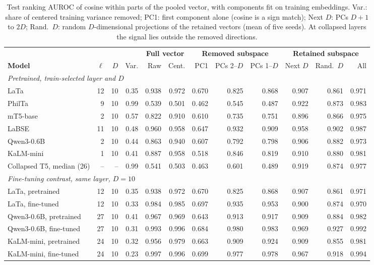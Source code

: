 \begin{table}[t]
\centering
\footnotesize
\setlength{\tabcolsep}{4pt}
\begin{tabular}{lrrrrrrrrrrr}
\toprule
& & & & \multicolumn{2}{c}{\textbf{Full vector}} & \multicolumn{3}{c}{\textbf{Removed subspace}} & \multicolumn{3}{c}{\textbf{Retained subspace}} \\
\cmidrule(lr){5-6}\cmidrule(lr){7-9}\cmidrule(lr){10-12}
\textbf{Model} & $\ell$ & $D$ & Var. & Raw & Cent. & PC1 & PCs 2--$D$ & PCs 1--$D$ & Next $D$ & Rand.\ $D$ & All \\
\midrule
\multicolumn{12}{l}{\emph{Pretrained, train-selected layer and $D$}} \\
LaTa & 12 & 10 & 0.35 & 0.938 & 0.972 & 0.670 & 0.825 & 0.868 & 0.907 & 0.861 & 0.971 \\
PhilTa & 9 & 10 & 0.99 & 0.539 & 0.501 & 0.462 & 0.545 & 0.487 & 0.922 & 0.873 & 0.983 \\
mT5-base & 2 & 10 & 0.57 & 0.822 & 0.910 & 0.610 & 0.735 & 0.751 & 0.896 & 0.866 & 0.975 \\
LaBSE & 11 & 10 & 0.48 & 0.960 & 0.958 & 0.647 & 0.932 & 0.909 & 0.958 & 0.902 & 0.987 \\
Qwen3-0.6B & 2 & 10 & 0.44 & 0.863 & 0.940 & 0.607 & 0.792 & 0.798 & 0.906 & 0.882 & 0.973 \\
KaLM-mini & 1 & 10 & 0.41 & 0.887 & 0.958 & 0.518 & 0.846 & 0.819 & 0.910 & 0.880 & 0.981 \\
Collapsed T5, median (26) & -- & -- & 0.99 & 0.541 & 0.503 & 0.463 & 0.601 & 0.489 & 0.919 & 0.874 & 0.977 \\
\midrule
\multicolumn{12}{l}{\emph{Fine-tuning contrast, same layer, $D=10$}} \\
LaTa, pretrained & 12 & 10 & 0.35 & 0.938 & 0.972 & 0.670 & 0.825 & 0.868 & 0.907 & 0.861 & 0.971 \\
LaTa, fine-tuned & 12 & 10 & 0.33 & 0.984 & 0.985 & 0.697 & 0.935 & 0.953 & 0.900 & 0.874 & 0.970 \\
Qwen3-0.6B, pretrained & 27 & 10 & 0.41 & 0.967 & 0.969 & 0.643 & 0.913 & 0.917 & 0.909 & 0.884 & 0.982 \\
Qwen3-0.6B, fine-tuned & 27 & 10 & 0.31 & 0.993 & 0.996 & 0.684 & 0.980 & 0.983 & 0.969 & 0.927 & 0.992 \\
KaLM-mini, pretrained & 24 & 10 & 0.32 & 0.956 & 0.979 & 0.663 & 0.909 & 0.924 & 0.909 & 0.855 & 0.981 \\
KaLM-mini, fine-tuned & 24 & 10 & 0.23 & 0.997 & 0.996 & 0.699 & 0.977 & 0.978 & 0.967 & 0.918 & 0.994 \\
\bottomrule
\end{tabular}
\caption{Test ranking AUROC of cosine within parts of the pooled vector, with components fit on training embeddings. Var.: share of centered training variance removed; PC1: first component alone (cosine is a sign match); Next $D$: PCs $D{+}1$ to $2D$; Rand.\ $D$: random $D$-dimensional projections of the retained vectors (mean of five seeds). At collapsed layers the signal lies outside the removed directions.}
\label{tab:e3_subspace_split}
\end{table}
